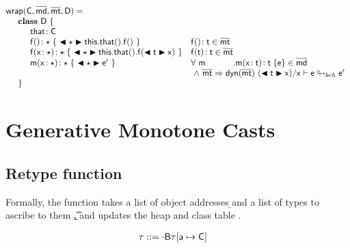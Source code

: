 \documentclass[a4paper,USenglish]{tex/lipics-v2016}
\begin{document}
\[\begin{array}{@{}ll@{}l@{}r@{~}c@{~}r}
\wrapAny\C\bmd\bmt\D = \\
\SP \class~\D~\{\\
\SPP \Fdef \that \C\\ 
\SPP   \Mdefz\f\any{~\BehCast\any{\Get{{\Get\this\that}}\f}~}
&  \Mtype\f{}\t \in \bmt\\
\SPP   \Mdef\f\x\any\any{~\BehCast\any{\Set{\Get\this\that}\f{\bscast\t\x}}~}
&  \Mtype\f\t\t \in \bmt\\
\SPP   \Mdef\m\x\any\any {~\BehCast\any{{\ep}}~}
&  \All \m \Mdef\m\x\t\t\e\in\b\md \\
&\multicolumn{5}{l}{~\wedge~\rtranst{\bmt}{\dyn{\bmt}}{(\BehCast\t\x)}\x{\e}{\ep}}
\\
\SP \}\\
\end{array}\]


\normalsize

\section{Generative Monotone Casts}

\subsection{Retype function}\label{retype}

Formally, the  function takes a list of object
addresses \b\a and a list of types to ascribe to them \b\t, and updates the
heap \s and class table \K. 

\begin{align*}
\S &::= \cdot \B \Map\S{\Bind\a\C}
\end{align*}
\begin{mathpar}


\end{mathpar}
\end{document}
